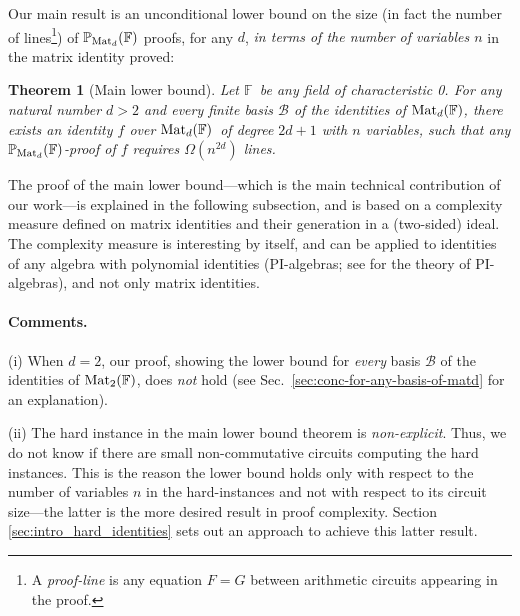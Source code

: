 \documentclass[12pt,reqno]{article}
\newtheorem{theorem}{Theorem}
\newcommand\F{\ensuremath{\mathbb F}}
\newcommand\PP{{\mathbb P}}
\newcommand\PMd{\ensuremath{\PP_{{\rm Mat}_d}(\F)}}
\newcommand {\para}[1] {\paragraph{#1}}
\newcommand{\matd}{{\ensuremath{{\rm Mat}_d(\F)}}}
\newcommand{\mattwo}{{\ensuremath{{\rm Mat}_2(\F)}}}
\begin{document}
\begin{center}
\end{center}




Our main result is an unconditional lower bound on the size (in fact the number of lines\footnote{A \textit{proof-line} is any equation $F=G$   between arithmetic circuits appearing in the proof.}) of $\PP_{{\rm Mat}_d}(\F) $ proofs, for any $d$, \textit{in terms of the number of variables $n$} in the matrix identity proved:

\begin{theorem}[Main lower bound]
\label{thm:main_lb_on_matrix_proofs}
Let \F\ be any field of characteristic 0.
For any natural number $d>2$ and  every finite basis \(\mathcal B\) of the  identities of \matd, there exists an identity \(f\) over \matd\ of degree $2d+1$ with $n$ variables, such that any \PMd-proof of $f$ requires $\Omega(n^{2d})$ lines.
\end{theorem}

The proof of the main lower bound---which is the main technical contribution of our work---is explained in the following subsection, and is based on a complexity measure defined on matrix identities and their generation in a (two-sided) ideal. The complexity measure is interesting by itself, and can be applied to identities of any algebra with polynomial identities (PI-algebras; see \cite{Row80,Dre99} for the theory of PI-algebras), and not only matrix identities.

\para{Comments.}

(i) When $d=2$, our proof, showing the lower bound for
\textit{every} basis \(\mathcal B\) of the identities of \mattwo, does \textit{not} hold (see Sec.~\ref{sec:conc-for-any-basis-of-matd} for an explanation).

(ii) The hard instance in the main lower bound theorem is \textit{non-explicit}.
Thus, we do not know if there are small non-commutative circuits computing the hard instances. This is the reason the lower bound holds only with respect to the number of variables $n$ in the hard-instances and not with respect to its circuit size---the latter is the more desired result in proof complexity.
Section \ref{sec:intro_hard_identities} sets out an approach to achieve this latter result.
\end{document}
